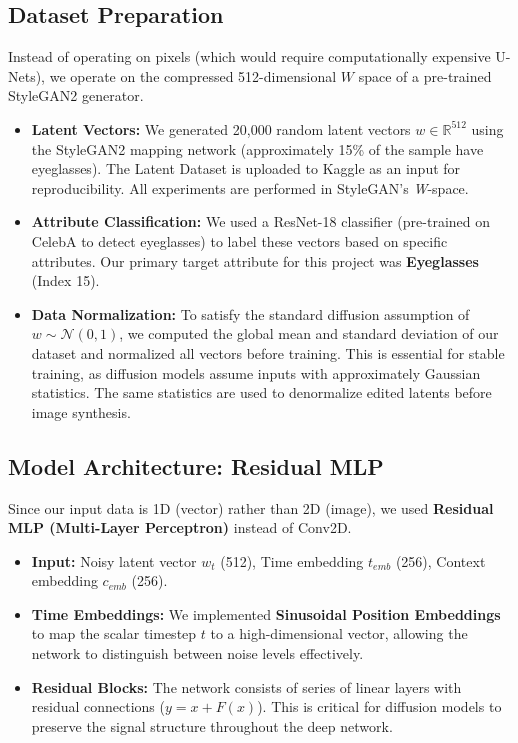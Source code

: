 \documentclass[12pt]{article}
\begin{document}
\subsection{Dataset Preparation}
Instead of operating on pixels (which would require computationally expensive U-Nets), we operate on the compressed 512-dimensional $W$ space of a pre-trained StyleGAN2 generator.
\begin{itemize}
    \item \textbf{Latent Vectors:} We generated 20,000 random latent vectors $w \in \mathbb{R}^{512}$ using the StyleGAN2 mapping network (approximately 15\% of the sample have eyeglasses). The Latent Dataset is uploaded to Kaggle as an input for reproducibility.
All experiments are performed in StyleGAN’s \textit{W}-space.

    \item \textbf{Attribute Classification:} We used a ResNet-18 classifier (pre-trained on CelebA to detect eyeglasses) to label these vectors based on specific attributes. Our primary target attribute for this project was \textbf{Eyeglasses} (Index 15).
    
    \item \textbf{Data Normalization:} To satisfy the standard diffusion assumption of $w \sim \mathcal{N}(0, 1)$, we computed the global mean and standard deviation of our dataset and normalized all vectors before training. This is essential for stable training, as diffusion models assume inputs with approximately Gaussian statistics. The same statistics are used to denormalize edited latents before image synthesis.

\end{itemize}

\subsection{Model Architecture: Residual MLP}
Since our input data is 1D (vector) rather than 2D (image), we used \textbf{Residual MLP (Multi-Layer Perceptron)} instead of Conv2D.
\begin{itemize}
    \item \textbf{Input:} Noisy latent vector $w_t$ (512), Time embedding $t_{emb}$ (256), Context embedding $c_{emb}$ (256).
    \item \textbf{Time Embeddings:} We implemented \textbf{Sinusoidal Position Embeddings} to map the scalar timestep $t$ to a high-dimensional vector, allowing the network to distinguish between noise levels effectively.
    \item \textbf{Residual Blocks:} The network consists of series of linear layers with residual connections ($y = x + F(x)$). This is critical for diffusion models to preserve the signal structure throughout the deep network.
\end{itemize}
\end{document}

